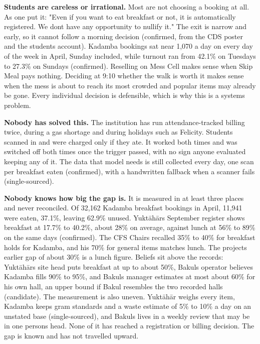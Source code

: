 \documentclass[
  10pt,
  table]{article}
\begin{document}
\textbf{Students are careless or irrational.} Most are not choosing a booking at all. As one put it: "Even if you want to eat breakfast or not, it is automatically registered. We don\textquotesingle t have any opportunity to nullify it." The exit is narrow and early, so it cannot follow a morning decision (confirmed, from the CDS poster and the student\textquotesingle s account). Kadamba bookings sat near 1,070 a day on every day of the week in April, Sunday included, while turnout ran from 42.1\% on Tuesdays to 27.3\% on Sundays (confirmed). Reselling on Mess Cell makes sense when Skip Meal pays nothing. Deciding at 9:10 whether the walk is worth it makes sense when the mess is about to reach its most crowded and popular items may already be gone. Every individual decision is defensible, which is why this is a systems problem.

\textbf{Nobody has solved this.} The institution has run attendance-tracked billing twice, during a gas shortage and during holidays such as Felicity. Students scanned in and were charged only if they ate. It worked both times and was switched off both times once the trigger passed, with no sign anyone evaluated keeping any of it. The data that model needs is still collected every day, one scan per breakfast eaten (confirmed), with a handwritten fallback when a scanner fails (single-sourced).

\textbf{Nobody knows how big the gap is.} It is measured in at least three places and never reconciled. Of 32,162 Kadamba breakfast bookings in April, 11,941 were eaten, 37.1\%, leaving 62.9\% unused. Yuktāhār\textquotesingle s September register shows breakfast at 17.7\% to 40.2\%, about 28\% on average, against lunch at 56\% to 89\% on the same days (confirmed). The CFS Chair\textquotesingle s recalled 35\% to 40\% for breakfast holds for Kadamba, and his 70\% for general items matches lunch. The project\textquotesingle s earlier gap of about 30\% is a lunch figure. Beliefs sit above the records: Yuktāhār\textquotesingle s site head puts breakfast at up to about 50\%, Bakul\textquotesingle s operator believes Kadamba fills 90\% to 95\%, and Bakul\textquotesingle s manager estimates at most about 60\% for his own hall, an upper bound if Bakul resembles the two recorded halls (candidate). The measurement is also uneven. Yuktāhār weighs every item, Kadamba keeps gram standards and a waste estimate of 5\% to 10\% a day on an unstated base (single-sourced), and Bakul\textquotesingle s lives in a weekly review that may be in one person\textquotesingle s head. None of it has reached a registration or billing decision. The gap is known and has not travelled upward.
\end{document}
